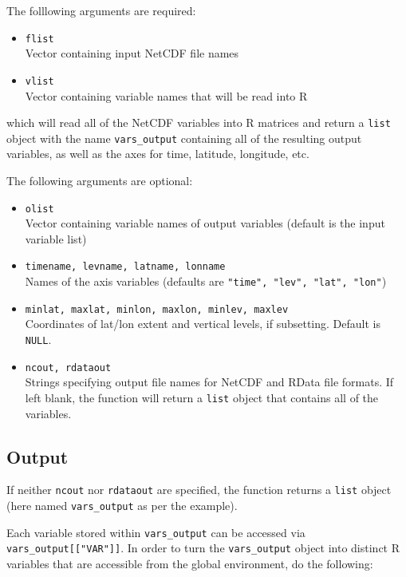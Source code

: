 \documentclass{article}
\begin{document}
The folllowing arguments are required:
\begin{itemize}
\item[] \texttt{flist}\\ Vector containing input NetCDF file names
\item[] \texttt{vlist}\\Vector containing variable names that will be read into R
\end{itemize}

which will read all of the NetCDF variables into R matrices and return a \texttt{list} object with the name \texttt{vars\_output} containing all of the resulting output variables, as well as the axes for time, latitude, longitude, etc. 

The following arguments are optional:
\begin{itemize}
\item[] \texttt{olist}\\ Vector containing variable names of output variables (default is the input variable list)
\item[] \texttt{timename, levname, latname, lonname}\\ Names of the axis variables (defaults are \texttt{"time", "lev", "lat", "lon"})
\item[] \texttt{minlat, maxlat, minlon, maxlon, minlev, maxlev}\\ Coordinates of lat/lon extent and vertical levels, if subsetting. Default is \texttt{NULL}.
\item[]\texttt{ncout, rdataout}\\ Strings specifying output file names for NetCDF and RData file formats. If left blank, the function will return a \texttt{list} object that contains all of the variables. 
\end{itemize}



\subsection{Output}

If neither \texttt{ncout} nor \texttt{rdataout} are specified, the function returns a \texttt{list} object (here named \texttt{vars\_output} as per the example).

Each variable stored within \texttt{vars\_output} can be accessed via \texttt{vars\_output[["VAR"]]}. In order to turn the \texttt{vars\_output} object into distinct R variables that are accessible from the global environment, do the following:
\end{document}
